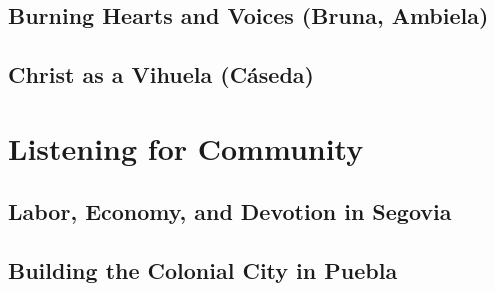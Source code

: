 \documentclass[draft]{vcbook}
\begin{document}
\chapter{Burning Hearts and Voices (Bruna, Ambiela)}
% 

\chapter{Christ as a Vihuela (Cáseda)}
% 

\part{Listening for Community}

\chapter{Labor, Economy, and Devotion in Segovia}
% 

\chapter{Building the Colonial City in Puebla}
% 

\printbibliography

\appendix
\appendixpage
\label{appendix}

\end{document}
